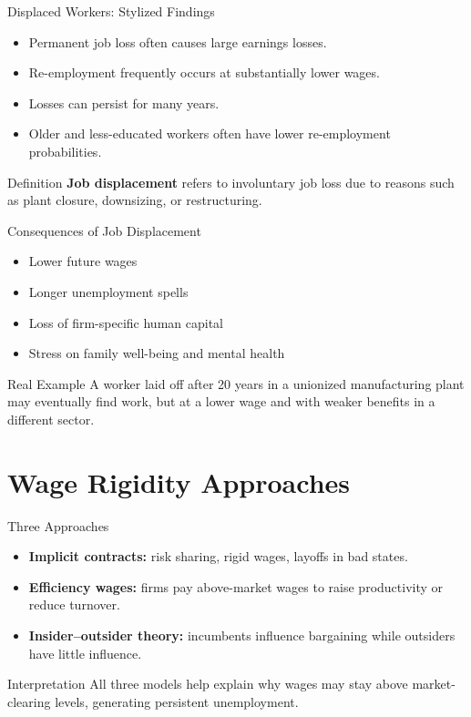 \documentclass[aspectratio=169]{beamer}
\begin{document}
\begin{frame}{Displaced Workers: Stylized Findings}
\transfade
\begin{itemize}
  \item Permanent job loss often causes large earnings losses.
  \item Re-employment frequently occurs at substantially lower wages.
  \item Losses can persist for many years.
  \item Older and less-educated workers often have lower re-employment probabilities.
\end{itemize}

\begin{block}{Definition}
\textbf{Job displacement} refers to involuntary job loss due to reasons such as plant closure, downsizing, or restructuring.
\end{block}
\end{frame}

\begin{frame}{Consequences of Job Displacement}
\transfade
\begin{itemize}
  \item Lower future wages
  \item Longer unemployment spells
  \item Loss of firm-specific human capital
  \item Stress on family well-being and mental health
\end{itemize}

\begin{exampleblock}{Real Example}
A worker laid off after 20 years in a unionized manufacturing plant may eventually find work, but at a lower wage and with weaker benefits in a different sector.
\end{exampleblock}
\end{frame}

\section{Wage Rigidity Approaches}

\begin{frame}{Three Approaches}
\transfade
\begin{itemize}
  \item \textbf{Implicit contracts:} risk sharing, rigid wages, layoffs in bad states.
  \item \textbf{Efficiency wages:} firms pay above-market wages to raise productivity or reduce turnover.
  \item \textbf{Insider--outsider theory:} incumbents influence bargaining while outsiders have little influence.
\end{itemize}

\begin{block}{Interpretation}
All three models help explain why wages may stay above market-clearing levels, generating persistent unemployment.
\end{block}
\end{frame}
\end{document}
